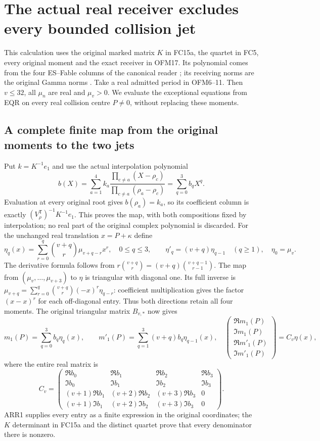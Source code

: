 \section{The actual real receiver excludes every bounded collision jet}
This calculation uses the original marked matrix $K$ in FC15a,
the quartet in FC5, every original moment and the exact receiver in
OFM17. Its polynomial comes from the four ES--Fable columns of the
canonical reader \cite{ES488}; its receiving norms are the original
Gamma norms \cite{WCF}. Take a real admitted period in OFM6--11.
Then $v\le32$, all $\mu_n$ are real and $\mu_v>0$.
We evaluate the exceptional equations from EQR on every real
collision centre $P\ne0$, without replacing these moments.

\subsection{A complete finite map from the original moments to the two jets}
Put $k=K^{-1}e_1$ and use the actual interpolation polynomial
\[
 b(X)=\sum_{a=1}^4 k_a
       \frac{\prod_{c\ne a}(X-\rho_c)}
            {\prod_{c\ne a}(\rho_a-\rho_c)}
      =\sum_{q=0}^3 b_qX^q.
 \tag{ARR1}
\]
Evaluation at every original root gives $b(\rho_a)=k_a$, so its
coefficient column is exactly $(V_\rho^{\mathsf T})^{-1}K^{-1}e_1$.
This proves the map, with both compositions fixed by interpolation;
no real part of the original complex polynomial is discarded.
For the unchanged real translation $x=P+\kappa$ define
\[
 \eta_q(x)=\sum_{r=0}^q\binom{v+q}{r}\mu_{v+q-r}x^r,
 \quad0\le q\le3,\qquad
 \eta'_q=(v+q)\eta_{q-1}\quad(q\ge1),\quad\eta_0=\mu_v.
 \tag{ARR2}
\]
The derivative formula follows from
$r\binom{v+q}{r}=(v+q)\binom{v+q-1}{r-1}$.
The map from $(\mu_v,\ldots,\mu_{v+3})$ to $\eta$ is triangular
with diagonal one. Its full inverse is
$\mu_{v+q}=\sum_{r=0}^q\binom{v+q}{r}(-x)^r\eta_{q-r}$:
coefficient multiplication gives the factor $(x-x)^r$ for each
off-diagonal entry. Thus both directions retain all four moments.
The original triangular matrix $B_{v,*}$ now gives
\[
 m_1(P)=\sum_{q=0}^3b_q\eta_q(x),\qquad
 m'_1(P)=\sum_{q=1}^3(v+q)b_q\eta_{q-1}(x),
 \quad
 \begin{pmatrix}\Re m_1(P)\\\Im m_1(P)\\
 \Re m'_1(P)\\\Im m'_1(P)\end{pmatrix}=C_v\eta(x),
 \tag{ARR3}
\]
where the entire real matrix is
\[
 C_v=\begin{pmatrix}
 \Re b_0&\Re b_1&\Re b_2&\Re b_3\\
 \Im b_0&\Im b_1&\Im b_2&\Im b_3\\
 (v+1)\Re b_1&(v+2)\Re b_2&(v+3)\Re b_3&0\\
 (v+1)\Im b_1&(v+2)\Im b_2&(v+3)\Im b_3&0
 \end{pmatrix}.
 \tag{ARR4}
\]
ARR1 supplies every entry as a finite expression in the original
coordinates; the $K$ determinant in FC15a and the distinct quartet
prove that every denominator there is nonzero.

